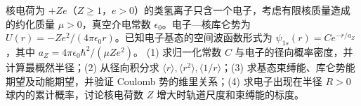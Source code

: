 核电荷为 \(+Ze\)（\(Z\ge1\)，\(e>0\)）的类氢离子只含一个电子，考虑有限核质量造成的约化质量 \(\mu>0\)，真空介电常数 \(\epsilon_0\)。电子—核库仑势为 \(U(r)=-Ze^2/(4\pi\epsilon_0r)\)。已知电子基态的空间波函数形式为 \(\psi_{1s}(r)=C e^{-r/a_Z}\)，其中 \(a_Z=4\pi\epsilon_0\hbar^2/(\mu Ze^2)\)。
(1) 求归一化常数 \(C\) 与电子的径向概率密度，并计算最概然半径；(2) 从径向积分求 \(\langle r\rangle,\langle r^2\rangle,\langle1/r\rangle\)；(3) 求基态束缚能、库仑势能期望及动能期望，并验证 Coulomb 势的维里关系；(4) 求电子出现在半径 \(R>0\) 球内的累计概率，讨论核电荷数 \(Z\) 增大时轨道尺度和束缚能的标度。
